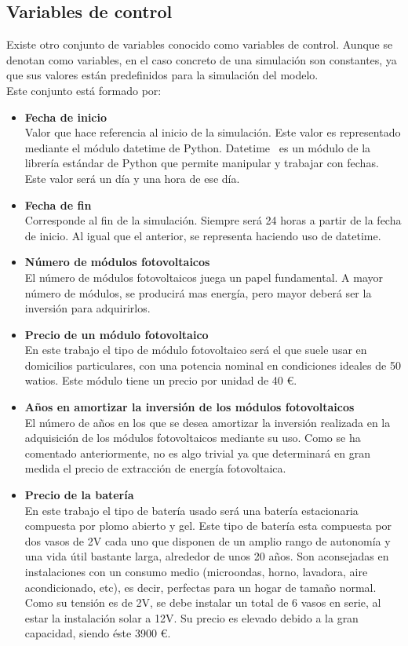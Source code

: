 \subsection{Variables de control}
Existe otro conjunto de variables conocido como variables de control. Aunque se denotan como variables, en el caso concreto de una simulación son constantes, ya que sus valores están predefinidos para la simulación del modelo.\\
Este conjunto está formado por:
\begin{itemize}
	\item \textbf{Fecha de inicio}\\ Valor que hace referencia al inicio de la simulación. Este valor es representado mediante el módulo datetime de Python. Datetime~\cite{Dtpy} es un módulo de la librería estándar de Python que permite manipular y trabajar con fechas. Este valor será un día y una hora de ese día.
	\item \textbf{Fecha de fin}\\ Corresponde al fin de la simulación. Siempre será 24 horas a partir de la fecha de inicio. Al igual que el anterior, se representa haciendo uso de datetime.
	\item \textbf{Número de módulos fotovoltaicos}\\ El número de módulos fotovoltaicos juega un papel fundamental. A mayor número de módulos, se producirá mas energía, pero mayor deberá ser la inversión para adquirirlos.
	\item \textbf{Precio de un módulo fotovoltaico}\\ En este trabajo el tipo de módulo fotovoltaico será el que suele usar en domicilios particulares, con una potencia nominal en condiciones ideales de 50 watios. Este módulo tiene un precio por unidad de 40 €.
	\item \textbf{Años en amortizar la inversión de los módulos fotovoltaicos}\\ El número de años en los que se desea amortizar la inversión realizada en la adquisición de los módulos fotovoltaicos mediante su uso. Como se ha comentado anteriormente, no es algo trivial ya que determinará en gran medida el precio de extracción de energía fotovoltaica.
	\item \textbf{Precio de la batería}\\ En este trabajo el tipo de batería usado será una batería estacionaria compuesta por plomo abierto y gel. Este tipo de batería esta compuesta por dos vasos de 2V cada uno que disponen de un amplio rango de autonomía y una vida útil bastante larga, alrededor de unos 20 años. Son aconsejadas en instalaciones con un consumo medio (microondas, horno, lavadora, aire acondicionado, etc), es decir, perfectas para un hogar de tamaño normal. Como su tensión es de 2V, se debe instalar un total de 6 vasos en serie, al estar la instalación solar a 12V. Su precio es elevado debido a la gran capacidad, siendo éste 3900 €.

\end{itemize}
